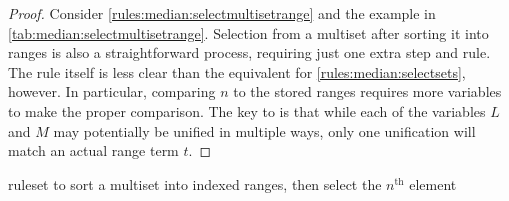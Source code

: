 \begin{proof}
Consider \cref{rules:median:selectmultisetrange} and the example in \cref{tab:median:selectmultisetrange}.  Selection from a multiset after sorting it into ranges is also a straightforward process, requiring just one extra step and rule.  The rule itself is less clear than the equivalent for \cref{rules:median:selectsets}, however.  In particular, comparing \(n\) to the stored ranges requires more variables to make the proper comparison.  The key to  is that while each of the variables \(L\) and \(M\) may potentially be unified in multiple ways, only one unification will match an actual range term \(t\).  
\end{proof}

\begin{cprulesetfloat}
\begin{cpruleset}





\end{cpruleset}
\caption{\label{rules:median:selectmultisetrange}\Gls{ruleset} to sort a multiset into indexed ranges, then select the \(n^{\text{th}}\) element}
\end{cprulesetfloat}

